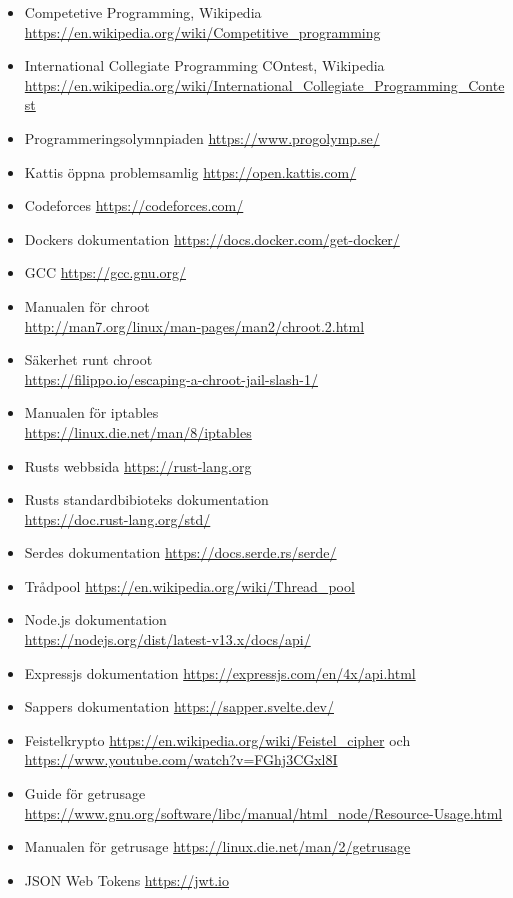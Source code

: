 \documentclass{article}
\begin{document}
\begin{itemize}
	\item Competetive Programming, Wikipedia \\
		\url{https://en.wikipedia.org/wiki/Competitive_programming}
	\item International Collegiate Programming COntest, Wikipedia \\
		\url{https://en.wikipedia.org/wiki/International_Collegiate_Programming_Contest}
	\item Programmeringsolymnpiaden \url{https://www.progolymp.se/}
	\item Kattis öppna problemsamlig \url{https://open.kattis.com/}
	\item Codeforces \url{https://codeforces.com/}
	\item Dockers dokumentation \url{https://docs.docker.com/get-docker/}
	\item GCC \url{https://gcc.gnu.org/}
	\item Manualen för chroot \\
		\url{http://man7.org/linux/man-pages/man2/chroot.2.html}
	\item Säkerhet runt chroot \\
		\url{https://filippo.io/escaping-a-chroot-jail-slash-1/}
	\item Manualen för iptables \\
		\url{https://linux.die.net/man/8/iptables}
	\item Rusts webbsida \url{https://rust-lang.org}
	\item Rusts standardbibioteks dokumentation \\
		\url{https://doc.rust-lang.org/std/}
	\item Serdes dokumentation \url{https://docs.serde.rs/serde/}
	\item Trådpool \url{https://en.wikipedia.org/wiki/Thread_pool}
	\item Node.js dokumentation \\
		\url{https://nodejs.org/dist/latest-v13.x/docs/api/}
	\item Expressjs dokumentation \url{https://expressjs.com/en/4x/api.html}
	\item Sappers dokumentation \url{https://sapper.svelte.dev/}
	\item Feistelkrypto \url{https://en.wikipedia.org/wiki/Feistel_cipher} och
		\\ \url{https://www.youtube.com/watch?v=FGhj3CGxl8I}
	\item Guide för getrusage
		\url{https://www.gnu.org/software/libc/manual/html_node/Resource-Usage.html}
	\item Manualen för getrusage
		\url {https://linux.die.net/man/2/getrusage}
	\item JSON Web Tokens \url{https://jwt.io}
\end{itemize}
\end{document}
